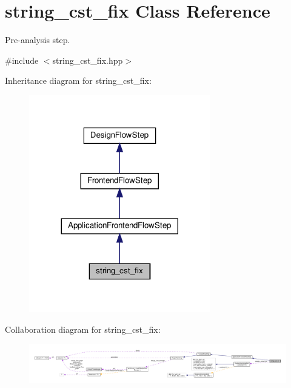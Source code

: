 \hypertarget{classstring__cst__fix}{}\section{string\+\_\+cst\+\_\+fix Class Reference}
\label{classstring__cst__fix}


Pre-\/analysis step.  




{\ttfamily \#include $<$string\+\_\+cst\+\_\+fix.\+hpp$>$}



Inheritance diagram for string\+\_\+cst\+\_\+fix\+:
\nopagebreak
\begin{figure}[H]
\begin{center}
\leavevmode
\includegraphics[width=224pt]{d1/d67/classstring__cst__fix__inherit__graph}
\end{center}
\end{figure}


Collaboration diagram for string\+\_\+cst\+\_\+fix\+:
\nopagebreak
\begin{figure}[H]
\begin{center}
\leavevmode
\includegraphics[width=350pt]{de/de4/classstring__cst__fix__coll__graph}
\end{center}
\end{figure}
